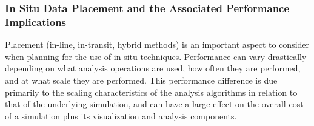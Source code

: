 \documentclass[x11names,table,xcdraw,graybox]{svmult}
\begin{document}



\subsubsection{In Situ Data Placement and the Associated Performance Implications}
\label{sec:implications}
Placement (in-line, in-transit, hybrid methods) is an important aspect to consider when planning for the use of in situ techniques. Performance can vary drastically depending on what analysis operations are used, how often they are performed, and at what scale they are performed. This performance difference is due primarily to the scaling characteristics of the analysis algorithms in relation to that of the underlying simulation, and can have a large effect on the overall cost of a simulation plus its visualization and analysis components.
\end{document}
